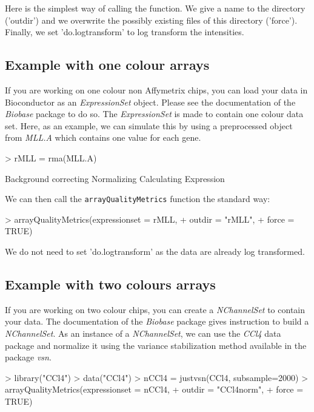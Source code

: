 \documentclass[a4paper]{article}
\newcommand{\Rpackage}[1]{\textit{#1}}
\newcommand{\Rclass}[1]{\textit{#1}}
\newcommand{\Rfunction}[1]{{\small\texttt{#1}}}
\begin{document}
Here is the simplest way of calling the function. We give a name to the directory ('outdir') and we overwrite the possibly existing files of this directory ('force'). Finally, we set 'do.logtransform' to log transform the intensities.


\subsection{Example with one colour arrays}
If you are working on one colour non Affymetrix chips, you can load your data in Bioconductor as an \Rclass{ExpressionSet} object. Please see the documentation of the \Rpackage{Biobase} package to do so. The \Rclass{ExpressionSet} is made to contain one colour data set. Here, as an example, we can simulate this by using a preprocessed object from \emph{MLL.A} which contains one value for each gene.

%
\begin{Schunk}
\begin{Sinput}
> rMLL = rma(MLL.A)
\end{Sinput}
\begin{Soutput}
Background correcting
Normalizing
Calculating Expression
\end{Soutput}
\end{Schunk}
%

We can then call the \Rfunction{arrayQualityMetrics} function the standard way:

%
\begin{Schunk}
\begin{Sinput}
> arrayQualityMetrics(expressionset = rMLL,
+                     outdir = "rMLL",
+                     force = TRUE)
\end{Sinput}
\end{Schunk}
%
We do not need to set 'do.logtransform' as the data are already log transformed.


\subsection{Example with two colours arrays}
If you are working on two colour chips, you can create a \Rclass{NChannelSet} to contain your data. The documentation of the \Rpackage{Biobase} package gives instruction to build a \Rclass{NChannelSet}.
As an instance of a \Rclass{NChannelSet}, we can use the \Rpackage{CCl4} data package and normalize it using the variance stabilization method available in the package \Rpackage{vsn}.

%
\begin{Schunk}
\begin{Sinput}
> library("CCl4")
> data("CCl4")
> nCCl4 = justvsn(CCl4, subsample=2000)
> arrayQualityMetrics(expressionset = nCCl4,
+                     outdir = "CCl4norm",
+                     force = TRUE)
\end{Sinput}
\end{Schunk}
%
\end{document}
